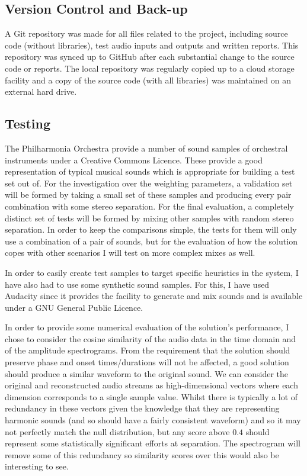 \documentclass[10pt,twoside,a4paper]{report}
\begin{document}
\subsection{Version Control and Back-up}

A Git repository was made for all files related to the project, including source code (without libraries), test audio inputs and outputs and written reports. This repository was synced up to GitHub after each substantial change to the source code or reports. The local repository was regularly copied up to a cloud storage facility and a copy of the source code (with all libraries) was maintained on an external hard drive.

\subsection{Testing}

The Philharmonia Orchestra provide a number of sound samples \cite{philharmonia} of orchestral instruments under a Creative Commons Licence. These provide a good representation of typical musical sounds which is appropriate for building a test set out of. For the investigation over the weighting parameters, a validation set will be formed by taking a small set of these samples and producing every pair combination with some stereo separation. For the final evaluation, a completely distinct set of tests will be formed by mixing other samples with random stereo separation. In order to keep the comparisons simple, the tests for them will only use a combination of a pair of sounds, but for the evaluation of how the solution copes with other scenarios I will test on more complex mixes as well.

In order to easily create test samples to target specific heuristics in the system, I have also had to use some synthetic sound samples. For this, I have used Audacity \cite{audacity} since it provides the facility to generate and mix sounds and is available under a GNU General Public Licence.

In order to provide some numerical evaluation of the solution's performance, I chose to consider the cosine similarity of the audio data in the time domain and of the amplitude spectrograms. From the requirement that the solution should preserve phase and onset times/durations will not be affected, a good solution should produce a similar waveform to the original sound. We can consider the original and reconstructed audio streams as high-dimensional vectors where each dimension corresponds to a single sample value. Whilst there is typically a lot of redundancy in these vectors given the knowledge that they are representing harmonic sounds (and so should have a fairly consistent waveform) and so it may not perfectly match the null distribution, but any score above $ 0.4 $ should represent some statistically significant efforts at separation. The spectrogram will remove some of this redundancy so similarity scores over this would also be interesting to see.
\end{document}
